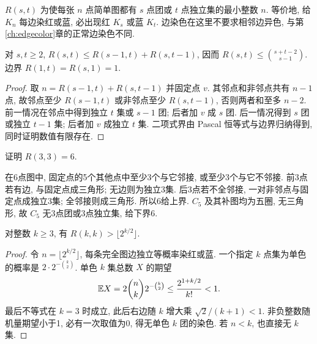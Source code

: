 \label{ch:ramsey}
\begin{definition}
$R(s,t)$ 为使每张 $n$ 点简单图都有 $s$ 点团或 $t$ 点独立集的最小整数 $n$. 等价地, 给 $K_n$ 每边染红或蓝, 必出现红 $K_s$ 或蓝 $K_t$. 边染色在这里不要求相邻边异色, 与第\ref{ch:edgecolor}章的正常边染色不同.
\end{definition}
\begin{theorem}\label{thm:ramseyrec}
对 $s,t\ge2$, $R(s,t)\le R(s-1,t)+R(s,t-1)$, 因而 $R(s,t)\le\binom{s+t-2}{s-1}$. 边界 $R(1,t)=R(s,1)=1$.
\end{theorem}
\begin{proof}
取 $n=R(s-1,t)+R(s,t-1)$ 并固定点 $v$. 其邻点和非邻点共有 $n-1$ 点, 故邻点至少 $R(s-1,t)$ 或非邻点至少 $R(s,t-1)$, 否则两者和至多 $n-2$. 前一情况在邻点中得到独立 $t$ 集或 $s-1$ 团; 后者加 $v$ 成 $s$ 团. 后一情况得到 $s$ 团或独立 $t-1$ 集; 后者加 $v$ 成独立 $t$ 集. 二项式界由 Pascal 恒等式与边界归纳得到, 同时证明数值有限存在.
\end{proof}
\begin{example}
证明 $R(3,3)=6$.
\end{example}
\begin{solution}
在6点图中, 固定点的5个其他点中至少3个与它邻接, 或至少3个与它不邻接. 前3点若有边, 与固定点成三角形; 无边则为独立3集. 后3点若不全邻接, 一对非邻点与固定点成独立3集; 全邻接则成三角形. 所以6给上界. $C_5$ 及其补图均为五圈, 无三角形, 故 $C_5$ 无3点团或3点独立集, 给下界6.
\end{solution}
\begin{center}
\end{center}
\begin{theorem}\label{thm:ramseylower}
对整数 $k\ge3$, 有 $R(k,k)>\lfloor2^{k/2}\rfloor$.
\end{theorem}
\begin{proof}
令 $n=\lfloor2^{k/2}\rfloor$, 每条完全图边独立等概率染红或蓝. 一个指定 $k$ 点集为单色的概率是 $2\cdot2^{-\binom k2}$. 单色 $k$ 集总数 $X$ 的期望
\[
\mathbb E X=2\binom nk2^{-\binom k2}\le\frac{2^{1+k/2}}{k!}<1.
\]
最后不等式在 $k=3$ 时成立, 此后右边随 $k$ 增大乘 $\sqrt2/(k+1)<1$. 非负整数随机量期望小于1, 必有一次取值为0, 得无单色 $k$ 团的染色. 若 $n<k$, 也直接无 $k$ 集.
\end{proof}
